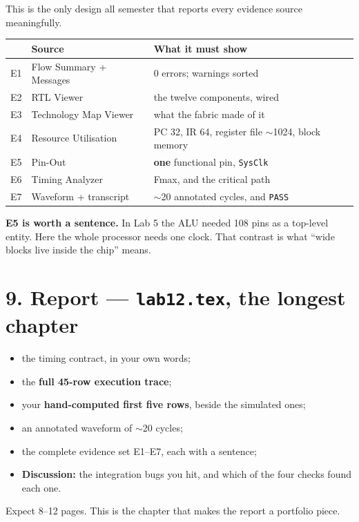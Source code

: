 \documentclass[11pt]{article}
\newcommand{\code}[1]{\texttt{#1}}
\begin{document}
This is the only design all semester that reports every evidence source
meaningfully.

\begin{center}
\begin{tabular}{lll}
\toprule
& Source & What it must show \\
\midrule
E1 & Flow Summary + Messages & 0 errors; warnings sorted \\
E2 & RTL Viewer & the twelve components, wired \\
E3 & Technology Map Viewer & what the fabric made of it \\
E4 & Resource Utilisation & PC 32, IR 64, register file $\sim$1024, block memory \\
E5 & Pin-Out & \textbf{one} functional pin, \code{SysClk} \\
E6 & Timing Analyzer & Fmax, and the critical path \\
E7 & Waveform + transcript & $\sim$20 annotated cycles, and \code{PASS} \\
\bottomrule
\end{tabular}
\end{center}

\textbf{E5 is worth a sentence.} In Lab 5 the ALU needed 108 pins as a top-level
entity. Here the whole processor needs one clock. That contrast is what ``wide
blocks live inside the chip'' means.

\section*{9. Report --- \code{lab12.tex}, the longest chapter}

\begin{itemize}[leftmargin=1.6em,itemsep=1pt]
\item the timing contract, in your own words;
\item the \textbf{full 45-row execution trace};
\item your \textbf{hand-computed first five rows}, beside the simulated ones;
\item an annotated waveform of $\sim$20 cycles;
\item the complete evidence set E1--E7, each with a sentence;
\item \textbf{Discussion:} the integration bugs you hit, and which of the four
checks found each one.
\end{itemize}

Expect 8--12 pages. This is the chapter that makes the report a portfolio piece.
\end{document}
